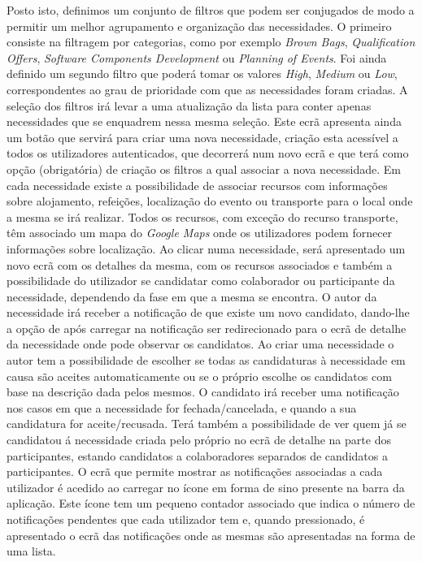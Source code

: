 Posto isto, definimos um conjunto de filtros que podem ser conjugados de modo a permitir um melhor agrupamento e organização das necessidades. O primeiro consiste na filtragem por categorias, como por exemplo \textit{Brown Bags}, 
\textit{Qualification Offers}, \textit{Software Components Development} ou \textit{Planning of Events}. 
Foi ainda definido um segundo filtro que poderá tomar os valores \textit{High}, \textit{Medium} ou \textit{Low}, 
correspondentes ao grau de prioridade com que as necessidades foram criadas. 
A seleção dos filtros irá levar a uma atualização da lista para conter apenas necessidades que se enquadrem nessa mesma seleção. 
Este ecrã apresenta ainda um botão que servirá para criar uma nova necessidade, criação esta acessível a todos os utilizadores autenticados, 
que decorrerá num novo ecrã e que terá como opção (obrigatória) de criação os filtros a qual associar a nova necessidade. 
Em cada necessidade existe a possibilidade de associar recursos com informações sobre alojamento, refeições, localização do evento ou transporte para o local onde a mesma se irá realizar. Todos os recursos, com exceção do recurso transporte, têm associado um mapa do \textit{Google Maps} onde os utilizadores podem fornecer informações sobre localização.
Ao clicar numa necessidade, será apresentado um novo ecrã com os detalhes da mesma, com os recursos associados e também a possibilidade do utilizador se candidatar como colaborador ou participante da necessidade, dependendo da fase em que a mesma se encontra. O autor da necessidade irá receber a notificação de que existe um novo candidato, 
dando-lhe a opção de após carregar na notificação ser redirecionado para o ecrã de detalhe da necessidade onde pode observar os candidatos. 
Ao criar uma necessidade o autor tem a possibilidade de escolher se todas as candidaturas à necessidade em causa são aceites automaticamente ou se o próprio escolhe os candidatos com base na descrição dada pelos mesmos.  
O candidato irá receber uma notificação nos casos em que a necessidade for fechada/cancelada, e quando a sua candidatura for aceite/recusada. 
Terá também a possibilidade de ver quem já se candidatou á necessidade criada pelo próprio no ecrã de detalhe na parte dos participantes, estando candidatos a colaboradores separados de candidatos a participantes. 
O ecrã que permite mostrar as notificações associadas a cada utilizador é acedido ao carregar no ícone em forma de sino presente na barra da aplicação. Este ícone tem um pequeno contador associado que indica o número de notificações pendentes que cada utilizador tem e, quando pressionado, é apresentado o ecrã das notificações onde as mesmas são apresentadas na forma de uma lista. 

